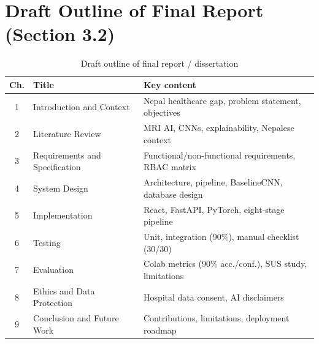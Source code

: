 \documentclass[11pt,a4paper]{article}
\begin{document}
\section{Draft Outline of Final Report (Section 3.2)}
\begin{table}[H]
\centering
\caption{Draft outline of final report / dissertation}
\label{tab:dissertation}
\small
\begin{tabular}{|c|l|p{9cm}|}
\hline
\textbf{Ch.} & \textbf{Title} & \textbf{Key content} \\
\hline
1 & Introduction and Context       & Nepal healthcare gap, problem statement, objectives \\
\hline
2 & Literature Review              & MRI AI, CNNs, explainability, Nepalese context \\
\hline
3 & Requirements and Specification & Functional/non-functional requirements, RBAC matrix \\
\hline
4 & System Design                  & Architecture, pipeline, BaselineCNN, database design \\
\hline
5 & Implementation                 & React, FastAPI, PyTorch, eight-stage pipeline \\
\hline
6 & Testing                        & Unit, integration (90\%), manual checklist (30/30) \\
\hline
7 & Evaluation                     & Colab metrics (90\% acc./conf.), SUS study, limitations \\
\hline
8 & Ethics and Data Protection     & Hospital data consent, AI disclaimers \\
\hline
9 & Conclusion and Future Work     & Contributions, limitations, deployment roadmap \\
\hline
\end{tabular}
\end{table}

\end{document}
